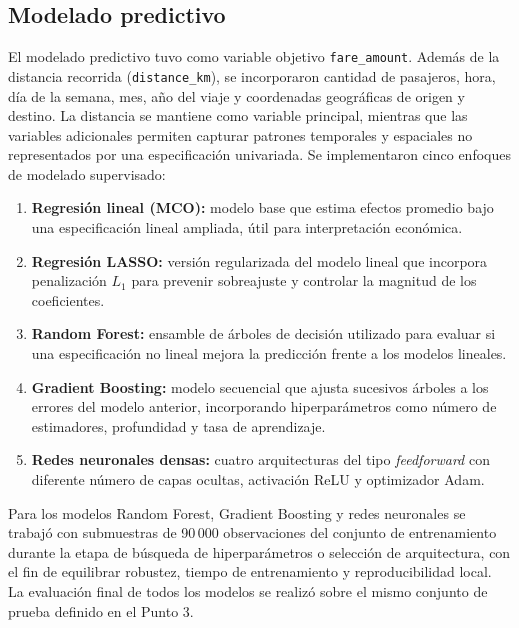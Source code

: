 \documentclass[10pt]{article}
\begin{document}
	\subsection{Modelado predictivo}
	El modelado predictivo tuvo como variable objetivo \texttt{fare\_amount}. Además de la distancia recorrida (\texttt{distance\_km}), se incorporaron cantidad de pasajeros, hora, día de la semana, mes, año del viaje y coordenadas geográficas de origen y destino. La distancia se mantiene como variable principal, mientras que las variables adicionales permiten capturar patrones temporales y espaciales no representados por una especificación univariada. Se implementaron cinco enfoques de modelado supervisado:
	\begin{enumerate}[label=\alph*)]
		\item \textbf{Regresión lineal (MCO):} modelo base que estima efectos promedio bajo una especificación lineal ampliada, útil para interpretación económica.
		\item \textbf{Regresión LASSO:} versión regularizada del modelo lineal que incorpora penalización $L_1$ para prevenir sobreajuste y controlar la magnitud de los coeficientes.
		\item \textbf{Random Forest:} ensamble de árboles de decisión utilizado para evaluar si una especificación no lineal mejora la predicción frente a los modelos lineales.
		\item \textbf{Gradient Boosting:} modelo secuencial que ajusta sucesivos árboles a los errores del modelo anterior, incorporando hiperparámetros como número de estimadores, profundidad y tasa de aprendizaje.
		\item \textbf{Redes neuronales densas:} cuatro arquitecturas del tipo \textit{feedforward} con diferente número de capas ocultas, activación ReLU y optimizador Adam.
	\end{enumerate}

	Para los modelos Random Forest, Gradient Boosting y redes neuronales se trabajó con submuestras de 90\,000 observaciones del conjunto de entrenamiento durante la etapa de búsqueda de hiperparámetros o selección de arquitectura, con el fin de equilibrar robustez, tiempo de entrenamiento y reproducibilidad local. La evaluación final de todos los modelos se realizó sobre el mismo conjunto de prueba definido en el Punto 3.
\end{document}
